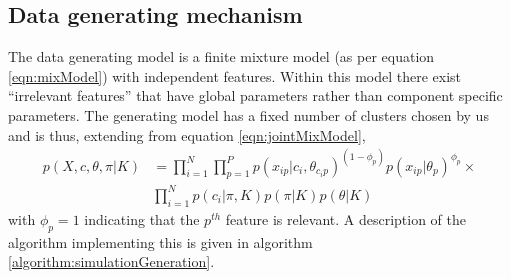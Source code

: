 \documentclass{bioinfo}
\begin{document}
\begin{methods}
\subsection{Data generating mechanism}
%

The data generating model is a finite mixture model (as per equation \ref{eqn:mixModel}) with independent features. Within this model there exist ``irrelevant features'' \citep{law2003feature} that have global parameters rather than component specific parameters. The generating model has a fixed number of clusters chosen by us and is thus, extending from equation \ref{eqn:jointMixModel},
\begin{align*}
p(X, c, \theta, \pi| K) &= \prod_{i=1}^N \prod_{p=1}^P p(x_{ip} | c_i, \theta_{c_ip})^{(1 - \phi_p)} p(x_{ip} | \theta_p) ^ {\phi_p} \times \\
& \prod_{i=1}^N p (c_i | \pi, K) p(\pi| K) p(\theta|K)
\end{align*}
with $\phi_p=1$ indicating that the $p^{th}$ feature is relevant. A description of the algorithm implementing this is given in algorithm \ref{algorithm:simulationGeneration}.


\end{methods}
\end{document}
